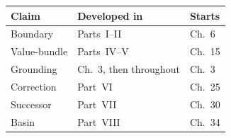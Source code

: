 \begin{center}
\small
\begin{tabular}{@{}lll@{}}
\toprule
\textbf{Claim} & \textbf{Developed in} & \textbf{Starts} \\
\midrule
Boundary & Parts~I--II & Ch.~6 \\
Value-bundle & Parts~IV--V & Ch.~15 \\
Grounding & Ch.~3, then throughout & Ch.~3 \\
Correction & Part~VI & Ch.~25 \\
Successor & Part~VII & Ch.~30 \\
Basin & Part~VIII & Ch.~34 \\
\bottomrule
\end{tabular}
\end{center}
